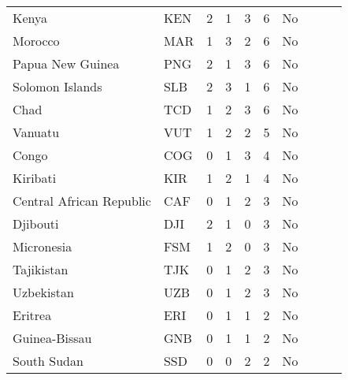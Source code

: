 \begin{singlespace}
{\begin{longtable}{l l c c c c c c c c}
Kenya                      & KEN           & 2          & 1                   & 3         & 6                 & No              \\
Morocco                    & MAR           & 1          & 3                   & 2         & 6                 & No              \\
Papua New Guinea           & PNG           & 2          & 1                   & 3         & 6                 & No              \\
Solomon Islands            & SLB           & 2          & 3                   & 1         & 6                 & No              \\
Chad                       & TCD           & 1          & 2                   & 3         & 6                 & No              \\
Vanuatu                    & VUT           & 1          & 2                   & 2         & 5                 & No              \\
Congo                      & COG           & 0          & 1                   & 3         & 4                 & No              \\
Kiribati                   & KIR           & 1          & 2                   & 1         & 4                 & No              \\
Central African Republic   & CAF           & 0          & 1                   & 2         & 3                 & No              \\
Djibouti                   & DJI           & 2          & 1                   & 0         & 3                 & No              \\
Micronesia                 & FSM           & 1          & 2                   & 0         & 3                 & No              \\
Tajikistan                 & TJK           & 0          & 1                   & 2         & 3                 & No              \\
Uzbekistan                 & UZB           & 0          & 1                   & 2         & 3                 & No              \\
Eritrea                    & ERI           & 0          & 1                   & 1         & 2                 & No              \\
Guinea-Bissau              & GNB           & 0          & 1                   & 1         & 2                 & No              \\
South Sudan                & SSD           & 0          & 0                   & 2         & 2                 & No              \\

\end{longtable}}
\end{singlespace}
